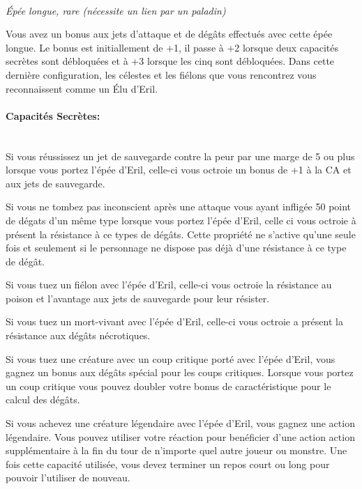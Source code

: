 \\
{\small \it Épée longue, rare (nécessite un lien par
un paladin)}\\
\label{EpeeEril}

Vous avez un bonus aux jets d'attaque et de dégâts effectués avec cette 
épée longue. Le bonus est initiallement de +1, il passe à +2 lorsque deux
capacités secrètes sont débloquées et à +3 lorsque les cinq sont débloquées.
Dans cette dernière configuration, les célestes et 
les fiélons que vous rencontrez vous reconnaissent comme un Élu d'Eril.

\paragraph{Capacités Secrètes:} ~ \\

Si vous réussissez un jet de sauvegarde contre la peur par une marge
de 5 ou plus lorsque vous portez l'épée d'Eril, celle-ci vous octroie
un bonus de +1 à la CA et aux jets de sauvegarde.

Si vous ne tombez pas inconscient après une attaque vous ayant infligée
50 point de dégats d'un même type lorsque vous portez l'épée d'Eril,
celle ci vous octroie à présent la résistance à ce types de dégâts. Cette 
propriété ne s'active qu'une seule fois et seulement si le personnage ne
dispose pas déjà d'une résistance à ce type de dégât. 

Si vous tuez un fiélon avec l'épée d'Eril, celle-ci vous octroie
la résistance au poison et l'avantage aux jets de sauvegarde pour leur
résister.

Si vous tuez un mort-vivant avec l'épée d'Eril, celle-ci vous octroie
a présent la résistance aux dégâts nécrotiques.

Si vous tuez une créature avec un coup critique porté avec l'épée d'Eril,
vous gagnez un bonus aux dégâts spécial pour les coups critiques. Lorsque 
vous portez un coup critique
vous pouvez doubler votre bonus de caractéristique pour le calcul des dégâts.

Si vous achevez une créature légendaire avec l'épée d'Eril, vous gagnez
une action légendaire. Vous pouvez utiliser votre réaction pour benéficier
d'une action action supplémentaire à la fin du tour de n'importe quel autre 
joueur ou monstre. Une fois cette capacité 
utilisée, vous devez terminer un repos court ou long pour pouvoir l'utiliser 
de nouveau. \\
